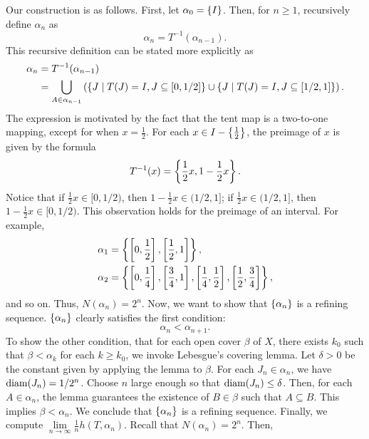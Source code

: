 \documentclass[10pt,twoside,draft]{book}
\begin{document}
Our construction is as follows.
First, let $\alpha_0 = \left \{ I \right \}$.
Then, for $n \geq 1$, recursively define $\alpha_n$ as
\begin{equation*}
  \alpha_n = T^{-1}(\alpha_{n-1}).
\end{equation*}
%
This recursive definition can be stated more explicitly as
\begin{align*}
  \alpha_n &= T^{-1}(\alpha_{n-1}) \\
  &= \bigcup\limits_{A \in \alpha_{n-1}} \left (  \left \{ J \mathrel{} \middle| \mathrel{} T(J) = I, J \subseteq [0,1/2] \right \} \cup \left \{ J \mathrel{} \middle| \mathrel{} T(J) = I, J \subseteq [1/2,1] \right \} \right ).
\end{align*}
The expression is motivated by the fact that the tent map is a two-to-one mapping, except for when $x = \frac{1}{2}$.
For each $x \in I - \left \{ \frac{1}{2} \right \}$, the preimage of $x$ is given by the formula
\begin{equation*}
  T^{-1}(x) = \left \{ \frac{1}{2} x, 1 - \frac{1}{2} x \right \}.
\end{equation*}
Notice that if $\frac{1}{2} x \in [0,1/2)$, then $1 - \frac{1}{2} x \in (1/2,1]$; if $\frac{1}{2} x \in (1/2,1]$, then $1 - \frac{1}{2} x \in [0,1/2)$. %
This observation holds for the preimage of an interval.
For example,
\begin{align*}
  \alpha_1 &= \left \{ \left [ 0,\frac{1}{2} \right ], \left [ \frac{1}{2}, 1 \right ] \right \}, \\
  \alpha_2 &= \left \{ \left [ 0,\frac{1}{4} \right ], \left [ \frac{3}{4}, 1 \right ], \left [ \frac{1}{4}, \frac{1}{2} \right ], \left [ \frac{1}{2}, \frac{3}{4} \right ] \right \},
\end{align*}
and so on.
Thus, $N(\alpha_{n}) = 2^n$.
Now, we want to show that $\left \{ \alpha_n \right \}$ is a refining sequence.
$\left \{ \alpha_n \right \}$ clearly satisfies the first condition:
\begin{equation*}
  \alpha_n < \alpha_{n+1}.
\end{equation*}
To show the other condition, that for each open cover $\beta$ of $X$, there exists $k_0$ such that $\beta < \alpha_k$ for each $k \geq k_0$, we invoke Lebesgue's covering lemma.
Let $\delta > 0$ be the constant given by applying the lemma to $\beta$.
For each $J_n \in \alpha_n$, we have $\mathrm{diam}(J_n) = 1/{2^n}$.
Choose $n$ large enough so that $\mathrm{diam}(J_n) \leq \delta$.
Then, for each $A \in \alpha_n$, the lemma guarantees the existence of $B \in \beta$ such that $A \subseteq B$.
This implies $\beta < \alpha_n$.
We conclude that $\left \{ \alpha_n \right \}$ is a refining sequence.
Finally, we compute $\lim\limits_{n \to \infty} \frac{1}{n} h(T, \alpha_n)$.
Recall that $N(\alpha_{n}) = 2^n$.
Then,
\end{document}
